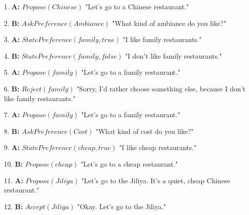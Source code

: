 	\begin{minipage}{\textwidth}
		{\ttfamily
			\linenumbers
			\begin{addmargin}[1em]{2em}%

				
			\vspace{0.5em}

						 	
			1.	\textbf{A:} $Propose(Chinese)$ "Let's go to a Chinese \hspace*{3mm} restaurant."
				
			2.	 \hspace*{3mm} \textbf{B:} $AskPreference(Ambiance)$  "What kind of \hspace*{4mm} ambiance do you like?"
				
			3.	\textbf{A:} $StatePreference(family,true)$ "I like family  \hspace*{3mm} restaurants."
				
			4.	\hspace*{3mm} 	\textbf{B:}  $StatePreference(family,false)$ "I don't like \hspace*{4mm} family restaurants."
				
			5.	\textbf{A:}  $Propose(family)$ "Let's go to a family \hspace*{3mm} restaurant."
				
			6.	\hspace*{3mm} 	\textbf{B:} $Reject(family)$ "Sorry, I'd rather choose \hspace*{4mm} something else, because I don't like family \hspace*{4mm} restaurants."
				
			7.	\textbf{A:}  $Propose(family)$ "Let's go to a family \hspace*{3mm} \hspace*{3mm} restaurant."
				
			8.	\hspace*{3mm} 	\textbf{B:} $AskPreference(Cost)$ "What kind of cost do you \hspace*{3mm} like?"
				
			9.	\textbf{A:} $StatePreference(cheap,true)$ "I like cheap \hspace*{3mm} restaurants."
				
			10.	\hspace*{3mm} 	\textbf{B:} $Propose(cheap)$ "Let's go to a cheap \hspace*{4mm} restaurant."
				
			11.	\textbf{A:}  $Propose(Jiliya)$ "Let's go to the Jiliya. It's a \hspace*{3mm} quiet, cheap Chinese restaurant."
				
			12.	\hspace*{3mm} 	\textbf{B:} $Accept(Jiliya)$  "Okay. Let's go to the Jiliya."


			\end{addmargin}
		} 
	\end{minipage}
